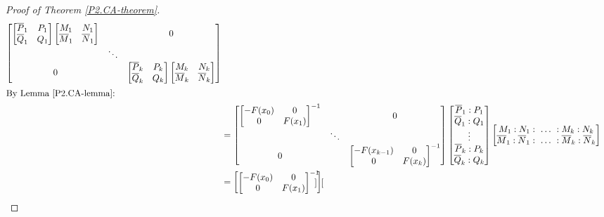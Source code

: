 \documentclass[10pt,reqno,oneside,a4paper]{article}
\begin{document}
\begin{proof}[Proof of Theorem \ref{P2.CA-theorem}]
\begin{align}
\begin{bmatrix}
\begin{bmatrix}
\overline{P}_1 & P_1 \\
\overline{Q}_1 & Q_1 
\end{bmatrix} 
\begin{bmatrix}
M_1 & N_1  \\
\overline{M}_1 & \overline{N}_1 
\end{bmatrix} & & 0 \\
 & \ddots & \\
0  & & 
\begin{bmatrix}
\overline{P}_k & P_k \\
\overline{Q}_k & Q_k 
\end{bmatrix} 
\begin{bmatrix}
M_k & N_k  \\
\overline{M}_k & \overline{N}_k 
\end{bmatrix}
\end{bmatrix} \nonumber \\
\intertext{By Lemma \ref{P2.CA-lemma}:}
&=
\begin{bmatrix}
\begin{bmatrix}
-F(x_0) & 0 \\
0 & F(x_1)
\end{bmatrix}^{-1} & & 0 \\
& \ddots & \\
0 & & \begin{bmatrix}
-F(x_{k-1}) & 0 \\
0 & F(x_k)
\end{bmatrix}^{-1}
\end{bmatrix} \begin{bmatrix}
\overline{P}_1 : P_1 \\
\overline{Q}_1 : Q_1 \\
\vdots \\
\overline{P}_k : P_k \\
\overline{Q}_k : Q_k 
\end{bmatrix}
\begin{bmatrix}
M_1 : N_1 :~ \ldots ~: M_k : N_k \\
\overline{M}_1 : \overline{N}_1 :~ \ldots ~: \overline{M}_k : \overline{N}_k 
\end{bmatrix}
\nonumber \\
&=
\begin{bmatrix}
\begin{bmatrix}
-F(x_0) & 0 \\
0 & F(x_1)
\end{bmatrix}^{-1}
\begin{bmatrix}

\end{bmatrix}
\end{bmatrix}
\end{align}
\end{proof}
\end{document}
